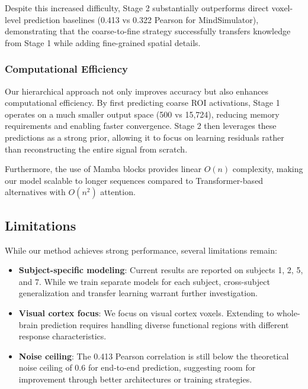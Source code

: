 Despite this increased difficulty, Stage 2 substantially outperforms direct voxel-level prediction baselines
(0.413 vs 0.322 Pearson for MindSimulator),
demonstrating that the coarse-to-fine strategy successfully transfers knowledge from Stage 1
while adding fine-grained spatial details.

\subsubsection{Computational Efficiency}

Our hierarchical approach not only improves accuracy but also enhances computational efficiency.
By first predicting coarse ROI activations, Stage 1 operates on a much smaller output space (500 vs 15,724),
reducing memory requirements and enabling faster convergence.
Stage 2 then leverages these predictions as a strong prior,
allowing it to focus on learning residuals rather than reconstructing the entire signal from scratch.

Furthermore, the use of Mamba blocks provides linear $O(n)$ complexity,
making our model scalable to longer sequences compared to Transformer-based alternatives with $O(n^2)$ attention.


\subsection{Limitations}

While our method achieves strong performance, several limitations remain:
\begin{itemize}
  \item \textbf{Subject-specific modeling}: Current results are reported on subjects 1, 2, 5, and 7.
        While we train separate models for each subject,
        cross-subject generalization and transfer learning warrant further investigation.
  \item \textbf{Visual cortex focus}: We focus on visual cortex voxels.
        Extending to whole-brain prediction requires handling diverse functional regions
        with different response characteristics.
  \item \textbf{Noise ceiling}: The 0.413 Pearson correlation is still below the theoretical noise ceiling of 0.6
        for end-to-end prediction, suggesting room for improvement through better architectures or training strategies.
\end{itemize}
